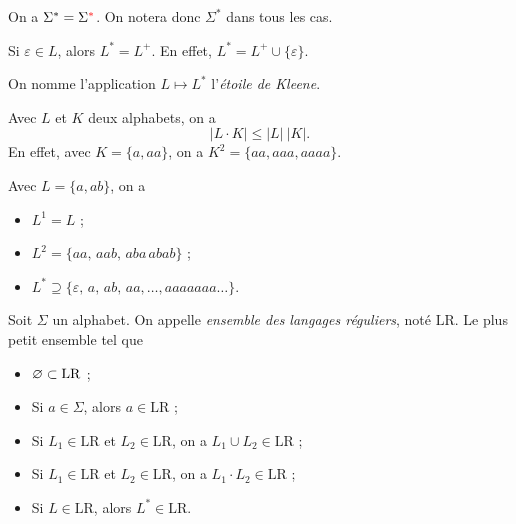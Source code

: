 \begin{rmk}
	On a $\Sigma^* = \Sigma^{{\color{red}*}}$. On notera donc $\Sigma^*$\/ dans tous les cas.
\end{rmk}

\begin{rmk}
	Si $\varepsilon \in L$, alors $L^* = L^+$. En effet, $L^* = L^+ \cup \{\varepsilon\}$.
\end{rmk}

\begin{rmk}
	On nomme l'application $L \mapsto L^*$\/ l'{\it étoile de \sc Kleene}.
\end{rmk}

\begin{rmk}
	Avec $L$\/ et $K$\/ deux alphabets, on a \[|L\cdot K| \le |L|\:|K|.\]
	En effet, avec $K = \{a,aa\}$, on a $K^2 = \{aa, aaa, aaaa\}$.
\end{rmk}

\begin{exm}
	Avec $L = \{a, ab\}$, on a
	\begin{itemize}
		\item $L^1 = L$\/ ;
		\item $L^2 = \{aa,\,aab,\,aba\,abab\}$\/ ;
		\item $L^* \supseteq \{\varepsilon,\,a,\,ab,\,aa,\ldots,aaaaaaa\ldots\}$.
	\end{itemize}
\end{exm}

\begin{defn}
	Soit $\Sigma$\/ un alphabet.
	On appelle {\it ensemble des langages réguliers}, noté $\mathrm{LR}$.
	Le plus petit ensemble tel que 
	\begin{itemize}
		\item $\varnothing \subset \mathrm{LR}$\/ ;
		\item Si $a \in \Sigma$, alors $a \in \mathrm{LR}$\/ ;
		\item Si $L_1 \in \mathrm{LR}$\/ et $L_2 \in \mathrm{LR}$, on a $L_1 \cup L_2 \in \mathrm{LR}$\/ ;
		\item Si $L_1 \in \mathrm{LR}$\/ et $L_2 \in \mathrm{LR}$, on a $L_1 \cdot L_2 \in \mathrm{LR}$\/ ;
		\item Si $L \in \mathrm{LR}$, alors $L^* \in \mathrm{LR}$.
	\end{itemize}
\end{defn}

